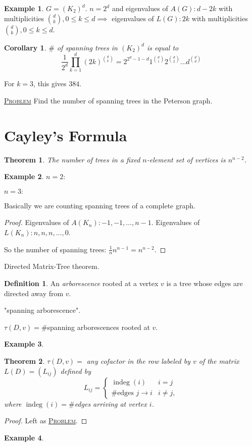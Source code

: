 \documentclass{report}
\newcommand{\fancyem}[1]{\underline{\textsc{#1}}}
\newtheorem{theorem}{Theorem}[section]
\newtheorem{corollary}{Corollary}[section]
\theoremstyle{definition}
\newtheorem{definition}{Definition}[section]
\newtheorem{example}{Example}[section]
\theoremstyle{remark}
\numberwithin{equation}{section}
\begin{document}
\begin{example}
    $G = (K_2)^d$.
    $n = 2^d$ and eigenvalues of $A(G): d - 2k$ with multiplicities $\binom{d}{k}, 0 \leq k \leq d \implies$ eigenvalues of $L(G): 2k$ with multiplicities $\binom{d}{k}, 0 \leq k \leq d$.
\end{example}
\begin{corollary}
    $\#$ of spanning trees in $(K_2)^d$ is equal to 
    \[
        \frac{1}{2^d} \prod_{k=1}^d (2k)^{\binom{d}{k}} = 2^{2^d - 1 - d}1^{\binom{d}{1}}2^{\binom{d}{2}}\ldots d^{\binom{d}{d}}     
    \]
\end{corollary}
For $k = 3$, this gives $384$.

\fancyem{Problem} Find the number of spanning trees in the Peterson graph.

\section{Cayley's Formula}
\begin{theorem}
    The number of trees in a fixed $n$-element set of vertices is $n^{n - 2}$.
\end{theorem}
\begin{example}
    $n = 2: $

    $n = 3: $

    Basically we are counting spanning trees of a complete graph.
\end{example}
\begin{proof}
    Eigenvalues of $A(K_n): -1, -1, \ldots, n - 1$. Eigenvalues of $L(K_n): n, n, n, \ldots, 0$.

    So the number of spanning trees: $\frac{1}{n}n^{n-1} = n^{n - 2}$.
\end{proof}

Directed Matrix-Tree theorem.
\begin{definition}
    An \emph{arborescence} rooted at a vertex $v$ is a tree whose edges are directed away from $v$.
\end{definition}
"spanning arborescence".

$\tau(D, v) = \#$spanning arborescences rooted at $v$.
\begin{example}
    
\end{example}

\begin{theorem}
    $\tau(D, v) = $ any cofactor in the row labeled by $v$ of the matrix $L(D) = (L_{ij})$ defined by
    \[
        L_{ij} = \begin{cases}
            \operatorname{indeg}(i) & i = j \\
            \#\text{edges $j \to i$} & i \neq j,
        \end{cases}    
    \]
    where $\operatorname{indeg}(i) = \#$edges arriving at vertex $i$.
\end{theorem}
\begin{proof}
    Left as \fancyem{Problem}.
\end{proof}
\begin{example}
    
\end{example}
\end{document}
